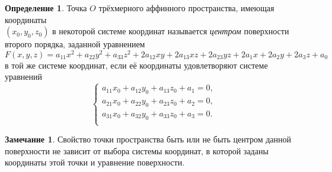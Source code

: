 \documentclass[a4paper, 12pt]{article}
\theoremstyle{definition}
\newtheorem*{definition}{Определение}
\newtheorem*{remark}{Замечание}
\begin{document}
\begin{definition}
    Точка $O$ трёхмерного аффинного пространства, имеющая координаты \\ $(x_0, y_0, z_0)$ в некоторой системе координат называется \textit{центром} поверхности второго порядка, заданной уравнением $F(x, y, z) = a_{11} x^2 + a_{22} y^2 + a_{33} z^2 + 2a_{12} xy + 2a_{13} xz + 2a_{23} yz + 2a_1 x + 2a_2 y + 2a_3 z + a_0$ в той же системе координат, если её координаты удовлетворяют системе уравнений
    \[
    \begin{cases}
        a_{11} x_0 + a_{12} y_0 + a_{13} z_0 + a_1 = 0, \\
        a_{21} x_0 + a_{22} y_0 + a_{23} z_0 + a_2 = 0, \\
        a_{31} x_0 + a_{32} y_0 + a_{33} z_0 + a_3 = 0. \\
    \end{cases}
    \]
\end{definition}

\begin{remark}
    Свойство точки пространства быть или не быть центром данной поверхности не зависит от выбора системы координат, в которой заданы координаты этой точки и уравнение поверхности.
\end{remark}
\end{document}
